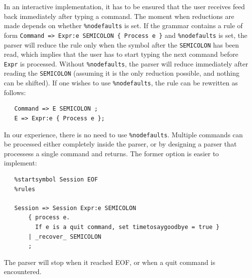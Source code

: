 \documentclass{article}
\begin{document}
In an interactive implementation, it has to be ensured that the 
user receives feed back immediately after typing a command. 
The moment when reductions are made depends on whether 
\verb+%nodefaults+ is set. 
If the grammar contains a rule of form 
\verb+Command => Expr:e SEMICOLON { Process e }+ 
and \verb+%nodefaults+ is set, the parser will reduce the rule
only when the symbol after the \verb+SEMICOLON+ has been read, which 
implies  that the user has to start typing the next command before 
\verb+Expr+ is processed. 
Without \verb+%nodefaults+, the parser will reduce immediately after
reading the \verb+SEMICOLON+ (assuming it is the only reduction
possible, and nothing can be shifted).
If one wishes to use \verb+%nodefaults+, the rule can be rewritten as
follows: 
\begin{verbatim}
   Command => E SEMICOLON ;
   E => Expr:e { Process e }; \end{verbatim}

\noindent
In our experience, there is no need to use
\verb|%nodefaults|.
Multiple commands can be processed either completely inside the parser,
or by designing a parser that processess a single command and returns. 
The former option is easier to implement: 
\begin{verbatim}
   %startsymbol Session EOF
   %rules 

   Session => Session Expr:e SEMICOLON 
       { process e. 
         If e is a quit command, set timetosaygoodbye = true } 
       | _recover_ SEMICOLON
       ; \end{verbatim} 
The parser will stop when it reached EOF, or when a quit command is 
encountered. 
\end{document}

